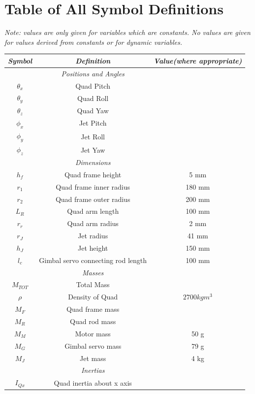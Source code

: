\documentclass[11pt,twoside]{article}
\begin{document}
\section{Table of All Symbol Definitions}
\begin{center}
    \emph{Note: values are only given for variables which are constants. No values are given for values derived from constants or for dynamic variables.}
\begin{longtable}{|ccc|}
    \hline
    \emph{Symbol} & \emph{Definition} & \emph{Value(where appropriate)} \\
    \hline \endhead
    & \emph{Positions and Angles} & \\
    \hline
    $\theta_x$ & Quad Pitch & \\
    $\theta_y$ & Quad Roll & \\
    $\theta_z$ & Quad Yaw & \\
    $\phi_x$ & Jet Pitch & \\
    $\phi_y$ & Jet Roll & \\
    $\phi_z$ & Jet Yaw & \\
    \hline
    & \emph{Dimensions} & \\
    \hline
    $h_f$ & Quad frame height & 5 mm \\
    $r_1$ & Quad frame inner radius & 180 mm \\
    $r_2$ & Quad frame outer radius & 200 mm \\
    $L_R$ & Quad arm length & 100 mm \\
    $r_r$ & Quad arm radius & 2 mm \\
    $r_J$ & Jet radius & 41 mm \\
    $h_J$ & Jet height & 150 mm \\
    $l_c$ & Gimbal servo connecting rod length & 100 mm \\
    \hline
    & \emph{Masses} & \\
    \hline
    $M_{TOT}$ & Total Mass & \\
    $\rho$ & Density of Quad & $2700 kgm^3$ \\
    $M_F$ & Quad frame mass & \\
    $M_R$ & Quad rod mass & \\
    $M_M$ & Motor mass & 50 g \\
    $M_G$ & Gimbal servo mass & 79 g \\
    $M_J$ & Jet mass & 4 kg\\
    \hline
    & \emph{Inertias} & \\
    \hline
    $I_{Qx}$ & Quad inertia about x axis & \\

\end{longtable}
\end{center}
\end{document}
